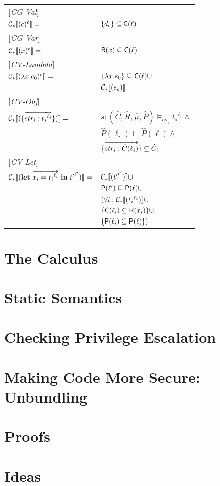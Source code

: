\documentclass[[12pt,a4paper,twoside,openrigh]{article}
\newcommand{\Cat}[0]{\hat{C}}
\newcommand{\muat}[0]{\hat{\mu}}
\newcommand{\Rat}[0]{\hat{R}}
\newcommand{\Pat}[0]{\hat{P}}
\newcommand{\cenvs}{(\Cat,\Rat,\muat,\Pat)}
\newcommand{\ccest}[1]{\cenvs \models_{c \rho_s} #1}
\newcommand{\lbt}[1]{{t_#1}^{\ell_#1}}
\newcommand{\letexprs}[3]{\mathbf{let}\ \vec{#1 = #2}\ \mathbf{in}\ #3}
\begin{document}
\begin{tabular}{l l}
{[\textit{CG-Val}]} \\
$ \mathcal{C}_*\llbracket (c)^\ell \rrbracket = $ & $\{d_c\} \subseteq \mathsf{C}(\ell)$ \\ 
{[\textit{CG-Var}]} \\
$ \mathcal{C}_*\llbracket (x)^\ell \rrbracket = $ & $\mathsf{R}(x) \subseteq \mathsf{C}(\ell)$ \\ 
{[\textit{CV-Lambda}]} \\
$ \mathcal{C}_*\llbracket (\lambda x.e_0)^\ell \rrbracket = $ & $\{\lambda x.e_0\} \subseteq \mathsf{C}(\ell) \cup $\\
& $ \mathcal{C}_*\llbracket (e_o) \rrbracket $ \\
{[\textit{CV-Obj}]} \\
$ \gen {\rec{\vec{str_i : \lbt i}}} = $ & $  s : \ccest {\lbt i} \wedge$\\
& $ \Pat(\ell_i) \sqsubseteq \Pat(\ell) \wedge$\\ 
& $\rec{\vec{str_i : \Cat(\ell_i)}} \subseteq \Cat_\ell $ \\
{[\textit{CV-Let}]} \\
$ \gen {\letexprs{x_i}{\lbt i}{{t'}^{\ell'}}} = $ & $ \mathcal{C}_*\llbracket ({t'}^{\ell'}) \rrbracket \cup$ \\
& $ \mathsf{P}(\ell') \sqsubseteq \mathsf{P}(\ell) \cup$\\
& $ (\forall i: \gen {\lbt i} \cup$ \\
& $ \{\mathsf{C}(\ell_i) \subseteq \mathsf{R}(x_i)\} \cup$ \\
& $ \{\mathsf{P}(\ell_i) \subseteq \mathsf{P}(\ell)\}) $ \\
\end{tabular}



\section{The Calculus}
\label{sec:calculus}


\section{Static Semantics}
\label{sec:statics}


\section{Checking Privilege Escalation}
\label{sec:privesc}

\newpage

\section{Making Code More Secure: Unbundling}
\label{sec:flow}

\newpage

\section{Proofs}
\label{sec:proofs}

\newpage

\section{Ideas}
\label{sec:ideas}
\end{document}
